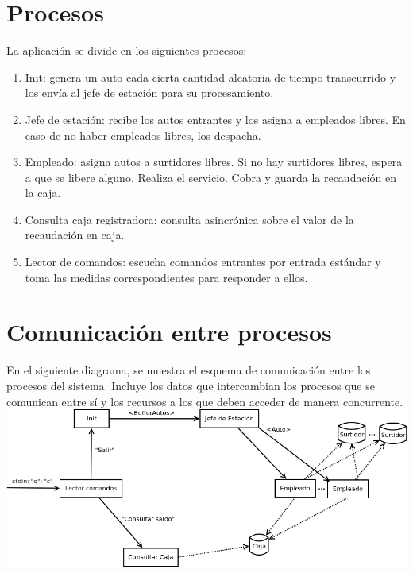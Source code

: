 \documentclass{article}
\begin{document}
\section{Procesos}
La aplicación se divide en los siguientes procesos:
\begin{enumerate}
	\item Init: genera un auto cada cierta cantidad aleatoria de tiempo transcurrido y los envía al jefe de estación para su procesamiento.
	\item Jefe de estación: recibe los autos entrantes y los asigna a empleados libres. En caso de no haber empleados libres, los despacha.
	\item Empleado: asigna autos a surtidores libres. Si no hay surtidores libres, espera a que se libere alguno. Realiza el servicio. Cobra y guarda la recaudación en la caja.
	\item Consulta caja registradora: consulta asincrónica sobre el valor de la recaudación en caja.
	\item Lector de comandos: escucha comandos entrantes por entrada estándar y toma las medidas correspondientes para responder a ellos.
\end{enumerate}

\section{Comunicación entre procesos}
En el siguiente diagrama, se muestra el esquema de comunicación entre los procesos del sistema. Incluye los datos que intercambian los procesos que se comunican entre sí y los recursos a los que deben acceder de manera concurrente.
\\[1\baselineskip]
\includegraphics[width=\textwidth]{overview}
\end{document}
